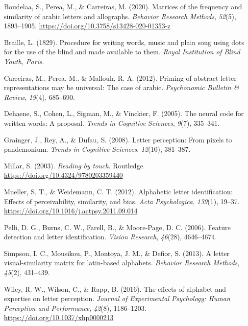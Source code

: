 \documentclass[english,man]{apa7}
\begin{document}
\begingroup
\setlength{\parindent}{-0.5in}
\setlength{\leftskip}{0.5in}

\hypertarget{refs}{}
\leavevmode\hypertarget{ref-Boudelaa_2020}{}%
Boudelaa, S., Perea, M., \& Carreiras, M. (2020). Matrices of the frequency and similarity of arabic letters and allographs. \emph{Behavior Research Methods}, \emph{52}(5), 1893--1905. \url{https://doi.org/10.3758/s13428-020-01353-z}

\leavevmode\hypertarget{ref-braille1829procedure}{}%
Braille, L. (1829). Procedure for writing words, music and plain song using dots for the use of the blind and made available to them. \emph{Royal Institution of Blind Youth, Paris}.

\leavevmode\hypertarget{ref-carreiras2012priming}{}%
Carreiras, M., Perea, M., \& Mallouh, R. A. (2012). Priming of abstract letter representations may be universal: The case of arabic. \emph{Psychonomic Bulletin \& Review}, \emph{19}(4), 685--690.

\leavevmode\hypertarget{ref-dehaene2005neural}{}%
Dehaene, S., Cohen, L., Sigman, M., \& Vinckier, F. (2005). The neural code for written words: A proposal. \emph{Trends in Cognitive Sciences}, \emph{9}(7), 335--341.

\leavevmode\hypertarget{ref-grainger2008letter}{}%
Grainger, J., Rey, A., \& Dufau, S. (2008). Letter perception: From pixels to pandemonium. \emph{Trends in Cognitive Sciences}, \emph{12}(10), 381--387.

\leavevmode\hypertarget{ref-Millar_2003}{}%
Millar, S. (2003). \emph{Reading by touch}. Routledge. \url{https://doi.org/10.4324/9780203359440}

\leavevmode\hypertarget{ref-Mueller_2012}{}%
Mueller, S. T., \& Weidemann, C. T. (2012). Alphabetic letter identification: Effects of perceivability, similarity, and bias. \emph{Acta Psychologica}, \emph{139}(1), 19--37. \url{https://doi.org/10.1016/j.actpsy.2011.09.014}

\leavevmode\hypertarget{ref-pelli2006feature}{}%
Pelli, D. G., Burns, C. W., Farell, B., \& Moore-Page, D. C. (2006). Feature detection and letter identification. \emph{Vision Research}, \emph{46}(28), 4646--4674.

\leavevmode\hypertarget{ref-simpson2013letter}{}%
Simpson, I. C., Mousikou, P., Montoya, J. M., \& Defior, S. (2013). A letter visual-similarity matrix for latin-based alphabets. \emph{Behavior Research Methods}, \emph{45}(2), 431--439.

\leavevmode\hypertarget{ref-Wiley_2016}{}%
Wiley, R. W., Wilson, C., \& Rapp, B. (2016). The effects of alphabet and expertise on letter perception. \emph{Journal of Experimental Psychology: Human Perception and Performance}, \emph{42}(8), 1186--1203. \url{https://doi.org/10.1037/xhp0000213}

\endgroup
\end{document}
